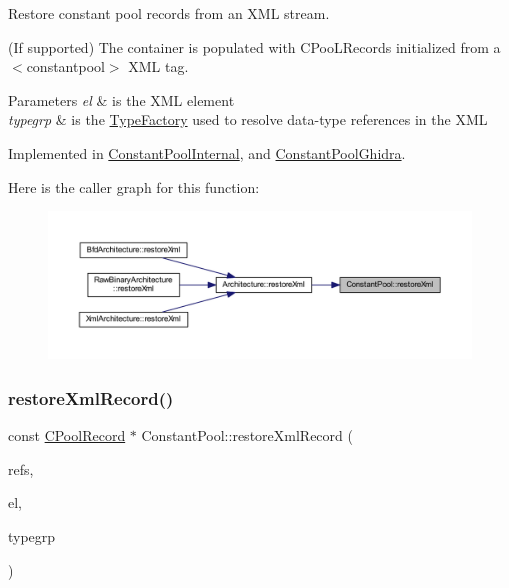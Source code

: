 Restore constant pool records from an X\+ML stream. 

(If supported) The container is populated with C\+Poo\+L\+Records initialized from a $<$constantpool$>$ X\+ML tag. 
\begin{DoxyParams}{Parameters}
{\em el} & is the X\+ML element \\
\hline
{\em typegrp} & is the \mbox{\hyperlink{class_type_factory}{Type\+Factory}} used to resolve data-\/type references in the X\+ML \\
\hline
\end{DoxyParams}


Implemented in \mbox{\hyperlink{class_constant_pool_internal_a28f4bf1f388ac9eb718f1790267b662d}{Constant\+Pool\+Internal}}, and \mbox{\hyperlink{class_constant_pool_ghidra_a4054279a4d397dda4a1fb33005c8e445}{Constant\+Pool\+Ghidra}}.

Here is the caller graph for this function\+:
\nopagebreak
\begin{figure}[H]
\begin{center}
\leavevmode
\includegraphics[width=350pt]{class_constant_pool_a1ba24a59e40a1110cdd5d2a63f1a978c_icgraph}
\end{center}
\end{figure}
\mbox{\label{class_constant_pool_a0d214988768d6bb90d2243018daec789}} 
\subsubsection{\texorpdfstring{restoreXmlRecord()}{restoreXmlRecord()}}
{\footnotesize\ttfamily const \mbox{\hyperlink{class_c_pool_record}{C\+Pool\+Record}} $\ast$ Constant\+Pool\+::restore\+Xml\+Record (\begin{DoxyParamCaption}\item[{const vector$<$ \mbox{\hyperlink{types_8h_a2db313c5d32a12b01d26ac9b3bca178f}{uintb}} $>$ \&}]{refs,  }\item[{const \mbox{\hyperlink{class_element}{Element}} $\ast$}]{el,  }\item[{\mbox{\hyperlink{class_type_factory}{Type\+Factory}} \&}]{typegrp }\end{DoxyParamCaption})}



